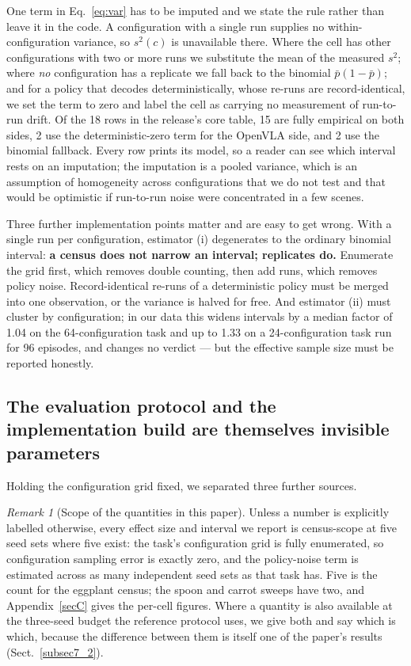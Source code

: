 \documentclass[pdflatex,iicol,sn-apa]{sn-jnl}
\theoremstyle{remark}
\newtheorem{remark}{Remark}
\begin{document}
One term in Eq.~\eqref{eq:var} has to be imputed and we state the rule rather than leave it in the
code. A configuration with a single run supplies no within-configuration variance, so $s^2(c)$ is
unavailable there. Where the cell has other configurations with two or more runs we substitute the
mean of the measured $s^2$; where \emph{no} configuration has a replicate we fall back to the
binomial $\bar p(1 - \bar p)$; and for a policy that decodes deterministically, whose re-runs are
record-identical, we set the term to zero and label the cell as carrying no measurement of run-to-run
drift. Of the 18 rows in the release's core table, 15 are fully empirical on both sides, 2 use the
deterministic-zero term for the OpenVLA side, and 2 use the binomial fallback. Every row prints its
model, so a reader can see which interval rests on an imputation; the imputation is a pooled
variance, which is an assumption of homogeneity across configurations that we do not test and that
would be optimistic if run-to-run noise were concentrated in a few scenes.

Three further implementation points matter and are easy to get wrong. With a single run per configuration,
estimator (i) degenerates to the ordinary binomial interval: \textbf{a census does not narrow an
interval; replicates do.} Enumerate the grid first, which removes double counting, then add runs,
which removes policy noise. Record-identical re-runs of a deterministic policy must be merged into
one observation, or the variance is halved for free. And estimator (ii) must cluster by
configuration; in our data this widens intervals by a median factor of 1.04 on the 64-configuration
task and up to 1.33 on a 24-configuration task run for 96 episodes, and changes no verdict --- but
the effective sample size must be reported honestly.

\subsection{The evaluation protocol and the implementation build are themselves invisible
parameters}\label{subsec5_5}

Holding the configuration grid fixed, we separated three further sources.

\begin{remark}[Scope of the quantities in this paper]\label{rem:scope}
Unless a number is explicitly labelled otherwise, every effect size and interval we report is
census-scope at five seed sets where five exist: the task's configuration grid is fully enumerated,
so configuration sampling error is exactly zero, and the policy-noise term is estimated across as
many independent seed sets as that task has. Five is the count for the eggplant census; the spoon
and carrot sweeps have two, and Appendix~\ref{secC} gives the per-cell figures. Where a quantity is also available at the three-seed budget the reference protocol uses, we
give both and say which is which, because the difference between them is itself one of the paper's
results (Sect.~\ref{subsec7_2}).
\end{remark}
\end{document}
